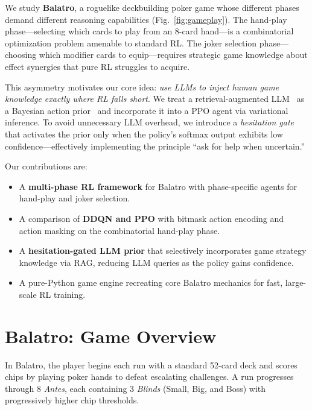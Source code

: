 \documentclass[conference]{IEEEtran}
\begin{document}
We study \textbf{Balatro}, a roguelike deckbuilding poker game whose different phases demand different reasoning capabilities (Fig.~\ref{fig:gameplay}).
The hand-play phase---selecting which cards to play from an 8-card hand---is a combinatorial optimization problem amenable to standard RL.
The joker selection phase---choosing which modifier cards to equip---requires strategic game knowledge about effect synergies that pure RL struggles to acquire.

This asymmetry motivates our core idea: \textit{use LLMs to inject human game knowledge exactly where RL falls short}.
We treat a retrieval-augmented LLM~\cite{lewis2020retrieval} as a Bayesian action prior~\cite{yan2024efficient} and incorporate it into a PPO agent via variational inference.
To avoid unnecessary LLM overhead, we introduce a \textit{hesitation gate} that activates the prior only when the policy's softmax output exhibits low confidence---effectively implementing the principle ``ask for help when uncertain.''

Our contributions are:
\begin{itemize}
    \item A \textbf{multi-phase RL framework} for Balatro with phase-specific agents for hand-play and joker selection.
    \item A comparison of \textbf{DDQN and PPO} with bitmask action encoding and action masking on the combinatorial hand-play phase.
    \item A \textbf{hesitation-gated LLM prior} that selectively incorporates game strategy knowledge via RAG, reducing LLM queries as the policy gains confidence.
    \item A pure-Python game engine recreating core Balatro mechanics for fast, large-scale RL training.
\end{itemize}

\section{Balatro: Game Overview}
\label{sec:game}

In Balatro, the player begins each run with a standard 52-card deck and scores chips by playing poker hands to defeat escalating challenges.
A run progresses through 8 \textit{Antes}, each containing 3 \textit{Blinds} (Small, Big, and Boss) with progressively higher chip thresholds.
\end{document}
